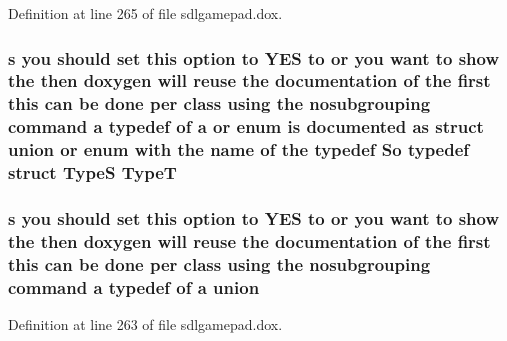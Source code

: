 Definition at line 265 of file sdlgamepad.\-dox.

\hypertarget{sdlgamepad_8dox_a75f821103190ea93dfc4c1a779ddc9f7}{
\subsubsection[{Type\-T}]{ {\bf s} you should {\bf set} this option to Y\-E\-S to or you want to show the then doxygen will reuse the documentation of the {\bf first} this can be {\bf done} per class using the nosubgrouping command {\bf a} typedef of {\bf a} or enum is documented as {\bf struct} {\bf union} or enum with the {\bf name} of the typedef So typedef {\bf struct} {\bf Type\-S}  Type\-T}}\label{sdlgamepad_8dox_a75f821103190ea93dfc4c1a779ddc9f7}
\hypertarget{sdlgamepad_8dox_a68000add3c95d09ceb97c3079515907d}{
\subsubsection[{union}]{ {\bf s} you should {\bf set} this option to Y\-E\-S to or you want to show the then doxygen will reuse the documentation of the {\bf first} this can be {\bf done} per class using the nosubgrouping command {\bf a} typedef of {\bf a} union}}\label{sdlgamepad_8dox_a68000add3c95d09ceb97c3079515907d}


Definition at line 263 of file sdlgamepad.\-dox.

